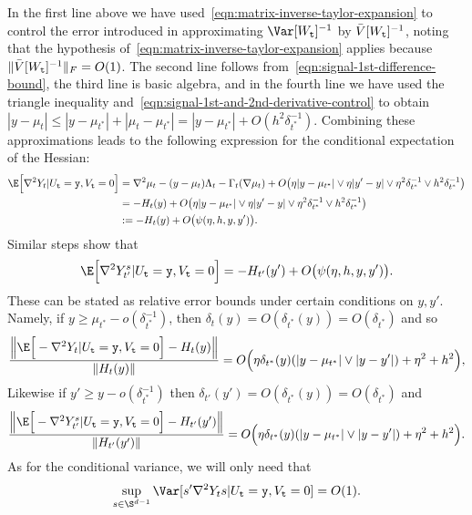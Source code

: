 \documentclass{article}
\begin{document}
	In the first line above we have used~\eqref{eqn:matrix-inverse-taylor-expansion} to control the error introduced in approximating $\Var[W_{{\tt t}}]^{-1}$ by $\bar{V}[W_{{\tt t}}]^{-1}$, noting that the hypothesis of~\eqref{eqn:matrix-inverse-taylor-expansion} applies because $\|\bar{V}[W_{{\tt t}}]^{-1}\|_F = O(1)$. The second line follows from~\eqref{eqn:signal-1st-difference-bound}, the third line is basic algebra, and in the fourth line we have used the triangle inequality and~\eqref{eqn:signal-1st-and-2nd-derivative-control} to obtain $
	|y - \mu_t| \leq |y - \mu_{t^*}| + |\mu_t - \mu_{t^*}| = |y - \mu_{t^*}| + O(h^2\delta_{t^*}^{-1})$. Combining these approximations leads to the following expression for the conditional expectation of the Hessian:
	\begin{equation}
		\label{eqn:randomized-kac-rice-hessian}
		\begin{aligned}
			\E\Big[\nabla^2 Y_t|U_{\tt t} = {\tt y}, V_{\tt t} = 0\Big] 
			& = \nabla^2 \mu_t - (y - \mu_t) \Lambda_t - \Gamma_t(\nabla \mu_t) + O\big(\eta|y - \mu_{t^*}| \vee \eta|y' - y| \vee \eta^2 \delta_{t^*}^{-1} \vee h^2 \delta_{t^*}^{-1}\big) \\
			& = -H_t(y) + O\big(\eta|y - \mu_{t^*}| \vee \eta|y' - y| \vee \eta^2 \delta_{t^*}^{-1} \vee h^2 \delta_{t^*}^{-1}\big) \\
			& := -H_t(y) + O\big(\psi(\eta,h,y,y')\big).
		\end{aligned}
	\end{equation}
	Similar steps show that
	\begin{equation}
		\label{eqn:randomized-kac-rice-hessian-2}
		\E\Big[\nabla^2 Y_{t'}^s|U_{\tt t} = {\tt y}, V_{\tt t} = 0\Big] = -H_{t'}(y') + O\big(\psi(\eta,h,y,y')\big).
	\end{equation}
	These can be stated as relative error bounds under certain conditions on $y,y'$. Namely, if $y \geq \mu_{t^*} - o(\delta_{t^*}^{-1})$, then $\delta_{t}(y) = O(\delta_{t^*}(y)) = O(\delta_{t^*})$ and so
	\begin{equation*}
		\frac{\Big\|\E\Big[-\nabla^2 Y_t|U_{\tt t} = {\tt y}, V_{\tt t} = 0\Big]  - H_t(y)\Big\|}{\|H_{t}(y)\|} = O\Big(\eta \delta_{t^*}(y)(|y - \mu_{t^*}| \vee |y - y'|) + \eta^2 + h^2\Big),
	\end{equation*}
	Likewise if $y' \geq y - o(\delta_{t^*}^{-1})$ then $\delta_{t'}(y') = O(\delta_{t^*}(y)) = O(\delta_{t^*})$ and
	\begin{equation*}
		\frac{\Big\|\E\Big[-\nabla^2 Y_{t'}^s|U_{\tt t} = {\tt y}, V_{\tt t} = 0\Big] - H_{t'}(y')\Big\|}{\|H_{t'}(y')\|} = O\Big(\eta \delta_{t^*}(y)(|y - \mu_{t^*}| \vee |y - y'|) + \eta^2 + h^2\Big).
	\end{equation*}
	As for the conditional variance, we will only need that 
	\begin{equation}
		\label{eqn:randomized-kac-rice-hessian-variance}
		\sup_{s \in \S^{d - 1}} \Var[s'\nabla^2 Y_t s|U_{{\tt t}} = {\tt y},V_{{\tt t}} = 0] = O(1).
	\end{equation}
	
\end{document}
